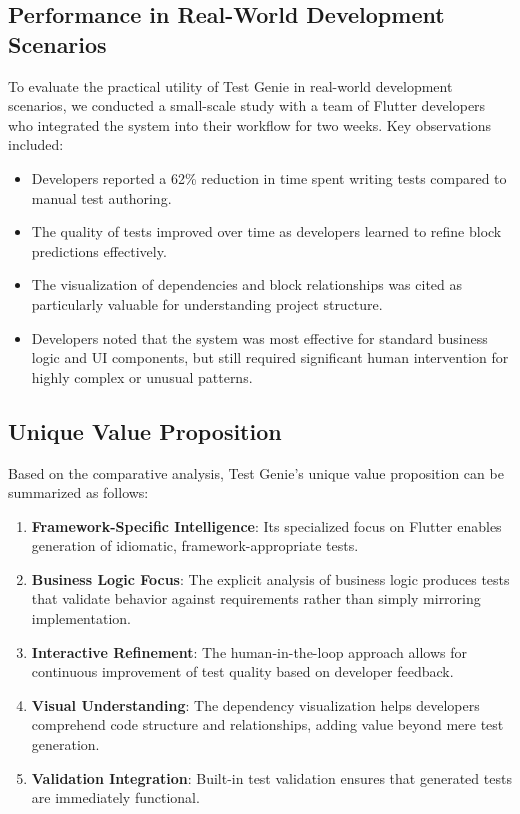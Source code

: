 \subsection{Performance in Real-World Development Scenarios}

To evaluate the practical utility of Test Genie in real-world development scenarios, we conducted a small-scale study with a team of Flutter developers who integrated the system into their workflow for two weeks. Key observations included:

\begin{itemize}
    \item Developers reported a 62\% reduction in time spent writing tests compared to manual test authoring.
    
    \item The quality of tests improved over time as developers learned to refine block predictions effectively.
    
    \item The visualization of dependencies and block relationships was cited as particularly valuable for understanding project structure.
    
    \item Developers noted that the system was most effective for standard business logic and UI components, but still required significant human intervention for highly complex or unusual patterns.
\end{itemize}

\subsection{Unique Value Proposition}

Based on the comparative analysis, Test Genie's unique value proposition can be summarized as follows:

\begin{enumerate}
    \item \textbf{Framework-Specific Intelligence}: Its specialized focus on Flutter enables generation of idiomatic, framework-appropriate tests.
    
    \item \textbf{Business Logic Focus}: The explicit analysis of business logic produces tests that validate behavior against requirements rather than simply mirroring implementation.
    
    \item \textbf{Interactive Refinement}: The human-in-the-loop approach allows for continuous improvement of test quality based on developer feedback.
    
    \item \textbf{Visual Understanding}: The dependency visualization helps developers comprehend code structure and relationships, adding value beyond mere test generation.
    
    \item \textbf{Validation Integration}: Built-in test validation ensures that generated tests are immediately functional.
\end{enumerate}

